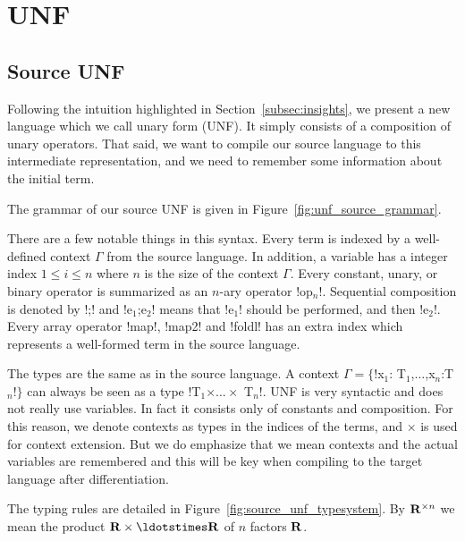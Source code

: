 \section{UNF}
\label{sec:unf}

\subsection{Source UNF} %
\label{sub:Source UNF}

Following the intuition highlighted in Section~\ref{subsec:insights}, we present a new language which we call unary form (UNF). 
It simply consists of a composition of unary operators. That said, we want to compile our source language to this intermediate representation, 
and we need to remember some information about the initial term. 

The grammar of our source UNF is given in Figure~\ref{fig:unf_source_grammar}. 



There are a few notable things in this syntax. 
Every term is indexed by a well-defined context $\Gamma$ from the source language.
In addition, a variable has a integer index $1\leq i\leq n$ where $n$ is the size of the context $\Gamma$.
Every constant, unary, or binary operator is summarized as an $n$-ary operator !op$_n$!.
Sequential composition is denoted by !;! and !e$_{1}$;e$_{2}$! means that !e$_{1}$! should be performed, and then !e$_{2}$!.
Every array operator !map!, !map2! and !foldl! has an extra index which represents a well-formed term in the source language.

The types are the same as in the source language. 
A context $\Gamma=\{$!x$_{1}$: T$_{1}$,$\ldots$,x$_n$:T$_n$!$\}$ can always be seen as a type !T$_{1}$$\times\ldots\times$ T$_n$!.
UNF is very syntactic and does not really use variables. 
In fact it consists only of constants and composition. 
For this reason, we denote contexts as types in the indices of the terms, and $\times$ is used for context extension.
But we do emphasize that we mean contexts and the actual variables are remembered and
this will be key when compiling to the target language after differentiation. 

The typing rules are detailed in Figure~\ref{fig:source_unf_typesystem}.
By $\mathbf{R}^{\times n}$ we mean the product $\reals\times\ldotstimes\reals$ of $n$ factors $\mathbf{R}$.



